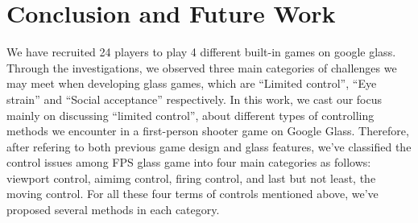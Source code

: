 \documentclass{sig-alternate}
\begin{document}



\section{Conclusion and Future Work}
We have recruited 24 players to play 4 different built-in games on google glass. Through the investigations, we observed three main categories of challenges we may meet when developing glass games, which are ``Limited control'', ``Eye strain'' and ``Social acceptance'' respectively. In this work, we cast our focus mainly on discussing ``limited control'', about different types of controlling methods we encounter in a first-person shooter game on Google Glass.
Therefore, after refering to both previous game design and glass features, we've classified the control issues among FPS glass game into four main categories as follows: viewport control, aimimg control, firing control, and last but not least, the moving control. For all these four terms of controls mentioned above, we've proposed several methods in each category.
\end{document}

